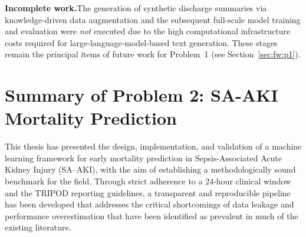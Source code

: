 \noindent
\textbf{Incomplete work.}\quad The generation of synthetic discharge summaries via knowledge-driven data augmentation and the subsequent full-scale model training and evaluation were \emph{not} executed due to the high computational infrastructure costs required for large-language-model-based text generation. These stages remain the principal items of future work for Problem~1 (see Section~\ref{sec:fw:p1}).


\section{Summary of Problem 2: SA-AKI Mortality Prediction}
This thesis has presented the design, implementation, and validation of a machine learning framework for early mortality prediction in Sepsis-Associated Acute Kidney Injury (SA--AKI), with the aim of establishing a methodologically sound benchmark for the field. Through strict adherence to a 24-hour clinical window and the TRIPOD reporting guidelines, a transparent and reproducible pipeline has been developed that addresses the critical shortcomings of data leakage and performance overestimation that have been identified as prevalent in much of the existing literature.

